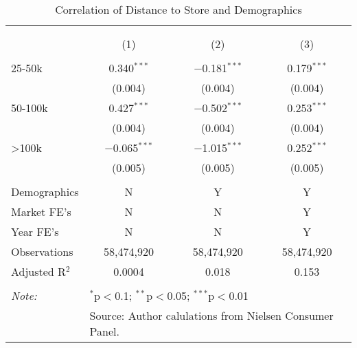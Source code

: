 
\begin{table}[!htbp] \centering 
  \caption{Correlation of Distance to Store and Demographics} 
  \label{tab:transportationCostsDist} 
\begin{tabular}{@{\extracolsep{5pt}}lccc} 
\\[-1.8ex]\hline 
\hline \\[-1.8ex] 
\\[-1.8ex] & (1) & (2) & (3)\\ 
\hline \\[-1.8ex] 
 25-50k & 0.340$^{***}$ & $-$0.181$^{***}$ & 0.179$^{***}$ \\ 
  & (0.004) & (0.004) & (0.004) \\ 
  50-100k & 0.427$^{***}$ & $-$0.502$^{***}$ & 0.253$^{***}$ \\ 
  & (0.004) & (0.004) & (0.004) \\ 
  >100k & $-$0.065$^{***}$ & $-$1.015$^{***}$ & 0.252$^{***}$ \\ 
  & (0.005) & (0.005) & (0.005) \\ 
 \hline \\[-1.8ex] 
Demographics & N & Y & Y \\ 
Market FE's & N & N & Y \\ 
Year FE's & N & N & Y \\ 
Observations & 58,474,920 & 58,474,920 & 58,474,920 \\ 
Adjusted R$^{2}$ & 0.0004 & 0.018 & 0.153 \\ 
\hline 
\hline \\[-1.8ex] 
\textit{Note:}  & \multicolumn{3}{l}{$^{*}$p$<$0.1; $^{**}$p$<$0.05; $^{***}$p$<$0.01} \\ 
 & \multicolumn{3}{l}{Source: Author calulations from Nielsen Consumer Panel.} \\ 
\end{tabular} 
\end{table} 
